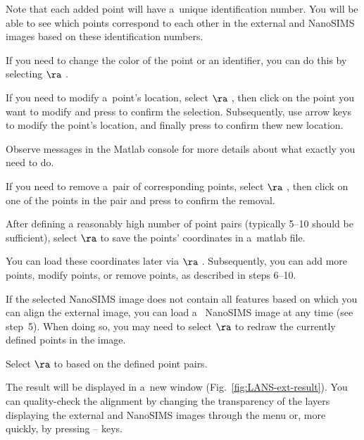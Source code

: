 \bul Note that each added point will have a~unique identification number. You will be able to see which points correspond to each other in the external and NanoSIMS images based on these identification numbers.

\bul If you need to change the color of the point or an identifier, you can do this by selecting  $\ra$ .

\s If you need to modify a~point's location, select  $\ra$ , then click on the point you want to modify and press  to confirm the selection. Subsequently, use arrow keys to modify the point's location, and finally press  to confirm thew new location.

\nb\bul Observe messages in the Matlab console for more details about what exactly you need to do.

\s If you need to remove a~pair of corresponding points, select  $\ra$ , then click on one of the points in the pair and press  to confirm the removal.

 \s After defining a reasonably high number of point pairs (typically 5--10 should be sufficient), select  $\ra$  to save the points' coordinates in a~matlab file. 
 
 \nb\bul You can load these coordinates later via  $\ra$ . Subsequently, you can add more points, modify points, or remove points, as described in steps 6--10.

\s If the selected NanoSIMS image does not contain all features based on which you can align the external image, you can load a~ NanoSIMS image at any time (see step~5). When doing so, you may need to select  $\ra$  to redraw the currently defined points in the image.

\s Select  $\ra$  to  based on the defined point pairs.

\nb\bul
The result will be displayed in a~new window (Fig.~\ref{fig:LANS-ext-result}). You can quality-check the alignment by changing the transparency of the layers displaying the external and NanoSIMS images through the  menu or, more quickly, by pressing  --  keys.

